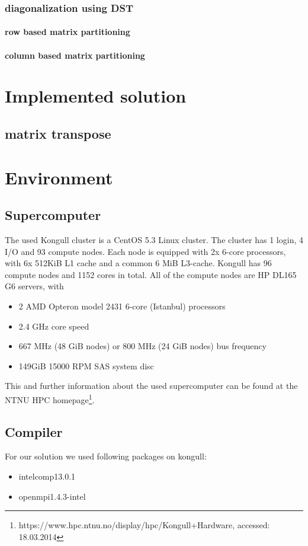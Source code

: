 \documentclass{article}
\begin{document}
\subsubsection{diagonalization using DST}

\paragraph{row based matrix partitioning}
\paragraph{column based matrix partitioning}
\section{Implemented solution}
\subsection{matrix transpose}
\section{Environment}
\subsection{Supercomputer}
The used Kongull cluster is a CentOS 5.3 Linux cluster. The cluster has 1 login, 4 I/O and 93 compute nodes. Each node is equipped with 2x 6-core processors, with 6x 512KiB L1 cache and a common 6 MiB L3-cache. Kongull has 96 compute nodes and 1152 cores in total. All of the compute nodes are HP DL165 G6 servers, with
\begin{itemize}
\item 2 AMD Opteron model 2431 6-core (Istanbul) processors
\item 2.4 GHz core speed
\item 667 MHz (48 GiB nodes) or 800 MHz (24 GiB nodes) bus frequency
\item 149GiB 15000 RPM SAS system disc
\end{itemize}
This and further information about the used supercomputer can be found at the NTNU HPC homepage\footnote{https://www.hpc.ntnu.no/display/hpc/Kongull+Hardware, accessed: 18.03.2014}.
\subsection{Compiler}

For our solution we used following packages on kongull:
\begin{itemize}
\item intelcomp13.0.1
\item openmpi1.4.3-intel
\end{itemize}
\end{document}
